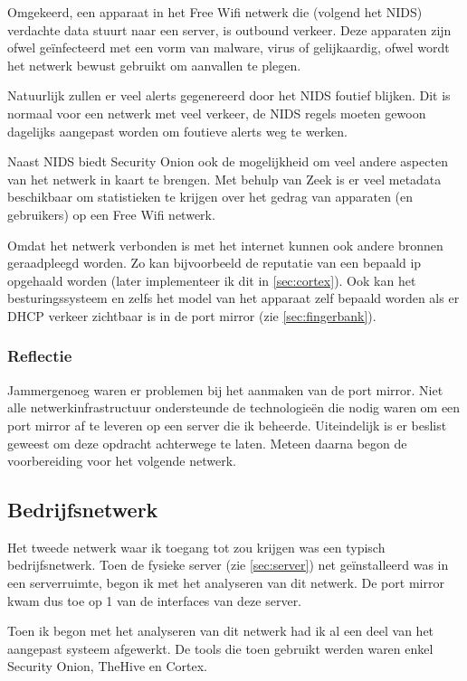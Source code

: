\documentclass[a4paper,12pt]{report}
\begin{document}
Omgekeerd, een apparaat in het Free Wifi netwerk die (volgend het NIDS) verdachte data stuurt naar een server, is outbound verkeer.
Deze apparaten zijn ofwel geïnfecteerd met een vorm van malware, virus of gelijkaardig, ofwel wordt het netwerk bewust gebruikt om aanvallen te plegen.

Natuurlijk zullen er veel alerts gegenereerd door het NIDS foutief blijken.
Dit is normaal voor een netwerk met veel verkeer, de NIDS regels moeten gewoon dagelijks aangepast worden om foutieve alerts weg te werken.

Naast NIDS biedt Security Onion ook de mogelijkheid om veel andere aspecten van het netwerk in kaart te brengen.
Met behulp van Zeek is er veel metadata beschikbaar om statistieken te krijgen over het gedrag van apparaten (en gebruikers) op een Free Wifi netwerk.

Omdat het netwerk verbonden is met het internet kunnen ook andere bronnen geraadpleegd worden.
Zo kan bijvoorbeeld de reputatie van een bepaald ip opgehaald worden (later implementeer ik dit in \ref{sec:cortex}).
Ook kan het besturingssysteem en zelfs het model van het apparaat zelf bepaald worden als er DHCP verkeer zichtbaar is in de port mirror (zie \ref{sec:fingerbank}).

\subsubsection{Reflectie}
Jammergenoeg waren er problemen bij het aanmaken van de port mirror.
Niet alle netwerkinfrastructuur ondersteunde de technologieën die nodig waren om een port mirror af te leveren op een server die ik beheerde.
Uiteindelijk is er beslist geweest om deze opdracht achterwege te laten.
Meteen daarna begon de voorbereiding voor het volgende netwerk.

\subsection{Bedrijfsnetwerk}
\label{sec:bedrijfsnetwerk}
Het tweede netwerk waar ik toegang tot zou krijgen was een typisch bedrijfsnetwerk.
Toen de fysieke server (zie \ref{sec:server}) net geïnstalleerd was in een serverruimte, begon ik met het analyseren van dit netwerk.
De port mirror kwam dus toe op 1 van de interfaces van deze server.

Toen ik begon met het analyseren van dit netwerk had ik al een deel van het aangepast systeem afgewerkt.
De tools die toen gebruikt werden waren enkel Security Onion, TheHive en Cortex.
\end{document}
